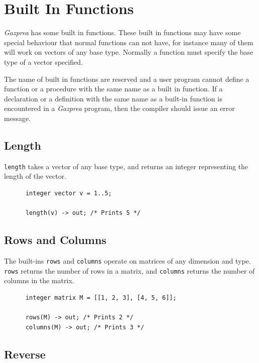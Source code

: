 \documentclass{article}
\begin{document}
\section{Built In Functions}\label{sec:builtIn}

  \textit{Gazprea} has some built in functions. These built in functions may have some special behaviour that normal
  functions can not have, for instance many of them will work on vectors of any base type. Normally a function must
  specify the base type of a vector specified.

  The name of built in functions are reserved and a user program cannot define a function or a procedure with the same
  name as a built in function. If a declaration or a definition with the same name as a built-in function is
  encountered in a \textit{Gazprea} program, then the compiler should issue an error message.

  \subsection{Length}\label{sec:length}

    \texttt{length} takes a vector of any base type, and returns an integer representing the length of the vector.

    \begin{lstlisting}
      integer vector v = 1..5;

      length(v) -> out; /* Prints 5 */
    \end{lstlisting}


  \subsection{Rows and Columns}\label{sec:rowsColumns}

    The built-ins \texttt{rows} and \texttt{columns} operate on matrices of any dimension and type. \texttt{rows}
    returns the number of rows in a matrix, and \texttt{columns} returns the number of columns in the matrix.

    \begin{lstlisting}
      integer matrix M = [[1, 2, 3], [4, 5, 6]];

      rows(M) -> out; /* Prints 2 */
      columns(M) -> out; /* Prints 3 */
    \end{lstlisting}


  \subsection{Reverse}\label{sec:reverse}
\end{document}
